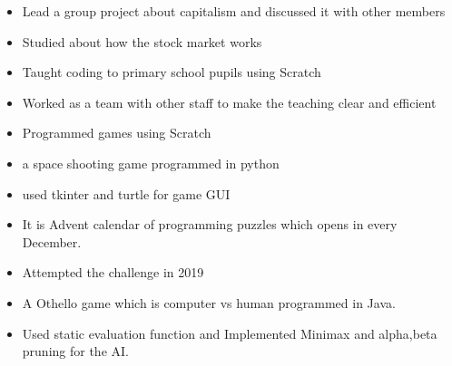 

\begin{itemize}

\item Lead a group project about capitalism and discussed it with other members
\item Studied about how the stock market works 
 
\end{itemize}

\divider


\begin{itemize}

\item Taught coding to primary school pupils using Scratch
\item Worked as a team with other staff to make the teaching clear and efficient
\item Programmed games using Scratch

\end{itemize}

\begin{itemize}

\item a space shooting game programmed in python
\item used tkinter and turtle for game GUI

\end{itemize}

\divider

\begin{itemize}

\item It is Advent calendar of programming puzzles which opens in every December.
\item Attempted the challenge in 2019

\end{itemize}

\divider

\begin{itemize}

\item A Othello game which is computer vs human programmed in Java.
\item Used static evaluation function and Implemented Minimax and alpha,beta pruning for the AI.

\end{itemize}

